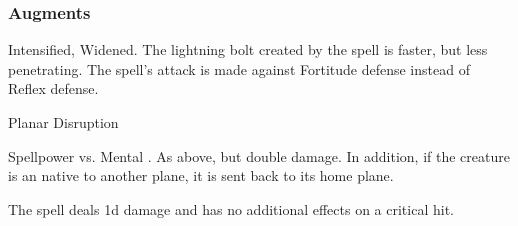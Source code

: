 \subsubsection{Augments}
 Intensified, Widened.
The lightning bolt created by the spell is faster, but less penetrating.
The spell's attack is made against Fortitude defense instead of Reflex defense.
\begin{spellsection}{Planar Disruption}
\begin{spellheader}
\end{spellheader}
\begin{spellcontent}
\begin{spelltargetinginfo}
\end{spelltargetinginfo}
\begin{spelleffects}
\begin{spellattack}{Spellpower vs. Mental}
\spellsuccess {}.
\spellcritical
As above, but double damage.
In addition, if the creature is an  native to another plane, it is sent back to its home plane.
\end{spellattack}
\end{spelleffects}
\end{spellcontent}
\begin{spellfooter}
\miscastexplode
\end{spellfooter}
\begin{spellcantrip}
The spell deals \minus1d damage and has no additional effects on a critical hit.
\end{spellcantrip}
\end{spellsection}
